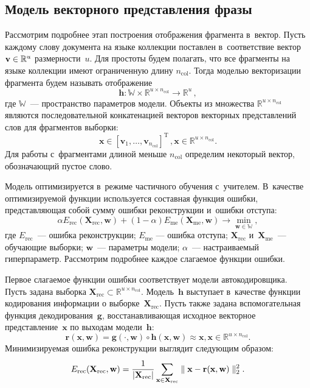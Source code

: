 \begin{multicols}{2}
\vspace*{-6pt}

\subsection{Модель векторного представления фразы}

Рассмотрим подробнее этап построения отображения фрагмента в~вектор.
Пусть каждому слову документа на языке коллекции поставлен в~соответствие вектор 
$\mathbf{v} \hm\in \mathbb{R}^u$ размерности~$u$. Для прос\-то\-ты будем полагать, что 
все фрагменты на языке коллекции имеют ограниченную длину $n_{\mathrm{col}}$.
Тогда моделью векторизации фрагмента будем называть отображение
$$
    \mathbf{h}: \mathbb{W} \times \mathbb{R}^{u \times n_{\mathrm{col}}} \to 
\mathbb{R}^u\,,
$$
где $\mathbb{W}$~--- пространство параметров модели. Объекты из множества 
$\mathbb{R}^{u \times n_{\mathrm{col}}}$ являются последовательной конкатенацией 
векторов векторных представлений слов для фрагментов выборки:
$$
\mathbf{x} \in [\mathbf{v}_1, \dots, \mathbf{v}_{n_{\mathrm{col}}}]^{\mathrm{T}}\,,  
\mathbf{x} \in \mathbb{R}^{u \times n_{\mathrm{col}}}.
$$
Для работы с~фрагментами длиной меньше $n_{\mathrm{col}}$ определим некоторый 
вектор, обозначающий пус\-тое слово.


Модель оптимизируется в~режиме частичного обучения с~учителем. В~качестве 
оптимизируемой функции используется составная функция ошибки, представляющая 
собой сумму ошибки реконструкции и~ошибки отступа:
\begin{equation}
\label{eq:alpha}
\alpha E_{\mathrm{rec}}\left(\mathbf{X}_{\mathrm{rec}}, \mathbf{w}\right) + (1 - 
\alpha)E_{\mathrm{me}}(\mathbf{X}_{\mathrm{me}},\mathbf{w}) \to \min_{\mathbf{w} \in 
\mathbb{W}},
\end{equation}
где $E_{\mathrm{rec}}$~--- ошибка реконструкции; $E_{\mathrm{me}}$ --- ошибка отступа; 
$\mathbf{X}_{\mathrm{rec}}$ и~$\mathbf{X}_{\mathrm{me}}$~--- обучающие выборки;  
$\mathbf{w}$~--- параметры модели; $\alpha$~--- настраиваемый гиперпараметр.
Рассмотрим подробнее каждое слагаемое функции ошибки.

Первое слагаемое функции ошибки соответствует модели автокодировщика.
Пусть задана выбор\-ка $\mathbf{X}_{\mathrm{rec}} \subset \mathbb{R}^{u \times 
n_{\mathrm{col}}}$.  Модель~$\mathbf{h}$ выступает в~качестве функции кодирования 
информации о выборке~$\mathbf{X}_{\mathrm{rec}}$. Пусть также задана вспомогательная 
функция декодирования~$\mathbf{g}$, восстанавливающая исходное векторное 
представление~$\mathbf{x}$ по выходам модели~$\mathbf{h}$:
$$
   \mathbf{r}(\mathbf{x}, \mathbf{w}) = \mathbf{g}(\cdot, \mathbf{w}) \circ 
\mathbf{h} (\mathbf{x}, \mathbf{w}) \approx  \mathbf{x},  \mathbf{x} \in 
\mathbb{R}^{u \times n_{\mathrm{col}}}.
$$
Минимизируемая ошибка реконструкции выглядит следующим образом:
\begin{equation}
\label{eq:rec}
E_{\mathrm{rec}}(\mathbf{X}_{\mathrm{rec}}, \mathbf{w}) = 
\displaystyle\frac{\displaystyle 1\mathstrut}{\displaystyle |\mathbf{X}_{\mathrm{rec}}|\mathstrut}\sum\limits_{\mathbf{x} \in \mathbf{X}_{\mathrm{rec}}} 
\parallel\mathbf{x}  - \mathbf{r}(\mathbf{x}, \mathbf{w}) \parallel^2_2.
\end{equation}



\end{multicols}
